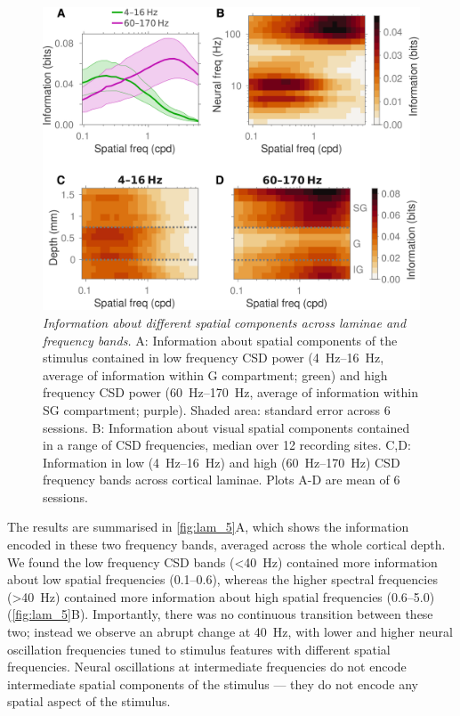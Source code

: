 \begin{figure}[htbp]
\centering \includegraphics[width=\columnwidth]{paperfigs/fig5}
%
\caption{%
\textit{Information about different spatial components across laminae and frequency bands.}
A: Information about spatial components of the stimulus contained in low frequency \ac{CSD} power (\SIrange{4}{16}{Hz}, average of information within \ac{G} compartment; green) and high frequency \ac{CSD} power (\SIrange{60}{170}{Hz}, average of information within \ac{SG} compartment; purple).
Shaded area: standard error across \num{6} sessions.
B: Information about visual spatial components contained in a range of \ac{CSD} frequencies, median over \num{12} recording sites.
C,D: Information in low (\SIrange{4}{16}{Hz}) and high (\SIrange{60}{170}{Hz}) \ac{CSD} frequency bands across cortical laminae.
Plots A-D are mean of \num{6} sessions.}%
\label{fig:lam_5}
%
\end{figure}
The results are summarised in \autoref{fig:lam_5}A, which shows the information encoded in these two frequency bands, averaged across the whole cortical depth.
We found the low frequency \ac{CSD} bands (\SI{<40}{Hz}) contained more information about low spatial frequencies (\SIrange{0.1}{0.6}{\cpd}), whereas the higher spectral frequencies (\SI{>40}{Hz}) contained more information about high spatial frequencies (\SIrange{0.6}{5.0}{\cpd}) (\autoref{fig:lam_5}B).
Importantly, there was no continuous transition between these two; instead we observe an abrupt change at \SI{40}{Hz}, with lower and higher neural oscillation frequencies tuned to stimulus features with different spatial frequencies.
Neural oscillations at intermediate frequencies do not encode intermediate spatial components of the stimulus --- they do not encode any spatial aspect of the stimulus.

